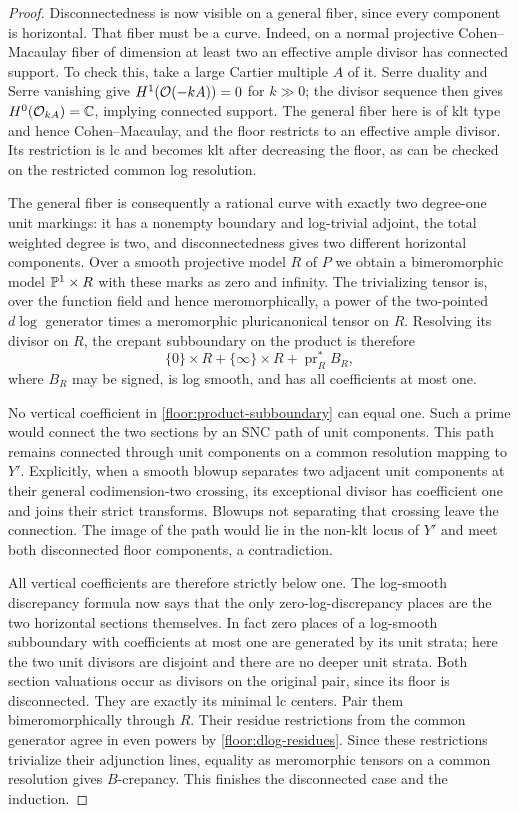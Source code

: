 \begin{proof}
Disconnectedness is now visible on a general fiber, since
every component is horizontal.  That fiber must be a
curve.  Indeed, on a normal projective Cohen--Macaulay
fiber of dimension at least two an effective ample
divisor has connected support.  To check this, take a
large Cartier multiple $A$ of it.  Serre duality and
Serre vanishing give $H^1(\mathcal{O}(-kA))=0$ for $k\gg0$;
the divisor sequence then gives
$H^0(\mathcal{O}_{kA})=\mathbb{C}$, implying connected support.
The general fiber here is of klt type and hence
Cohen--Macaulay, and the floor restricts to an effective
ample divisor.  Its restriction is lc and becomes klt
after decreasing the floor, as can be checked on the
restricted common log resolution.

The general fiber is consequently a rational curve with
exactly two degree-one unit markings: it has a nonempty
boundary and log-trivial adjoint, the total weighted
degree is two, and disconnectedness gives two different
horizontal components.  Over a smooth projective model
$R$ of $P$ we obtain a bimeromorphic model
$\mathbb{P}^1\times R$ with these marks as zero and infinity.
The trivializing tensor is, over the function field and
hence meromorphically, a power of the two-pointed
$d\log$ generator times a meromorphic pluricanonical
tensor on $R$.  Resolving its divisor on $R$, the
crepant subboundary on the product is therefore
\begin{equation}
 \label{floor:product-subboundary}
 \{0\}\times R+\{\infty\}\times R
       +\operatorname{pr}_R^*B_R,
\end{equation}
where $B_R$ may be signed, is log smooth, and has all
coefficients at most one.

No vertical coefficient in
\eqref{floor:product-subboundary} can equal one.  Such
a prime would connect the two sections by an SNC path
of unit components.  This path remains connected
through unit components on a common resolution mapping
to $Y'$.  Explicitly, when a smooth blowup separates
two adjacent unit components at their general
codimension-two crossing, its exceptional divisor has
coefficient one and joins their strict transforms.
Blowups not separating that crossing leave the
connection.  The image of the path would lie in the
non-klt locus of $Y'$ and meet both disconnected floor
components, a contradiction.

All vertical coefficients are therefore strictly below
one.  The log-smooth discrepancy formula now says that
the only zero-log-discrepancy places are the two
horizontal sections themselves.  In fact zero places
of a log-smooth subboundary with coefficients at most
one are generated by its unit strata; here the two
unit divisors are disjoint and there are no deeper
unit strata.  Both section valuations occur as
divisors on the original pair, since its floor is
disconnected.  They are exactly its minimal lc
centers.  Pair them bimeromorphically through $R$.
Their residue restrictions from the common generator
agree in even powers by \eqref{floor:dlog-residues}.
Since these restrictions trivialize their adjunction
lines, equality as meromorphic tensors on a common
resolution gives $B$-crepancy.  This finishes the
disconnected case and the induction.
\end{proof}

